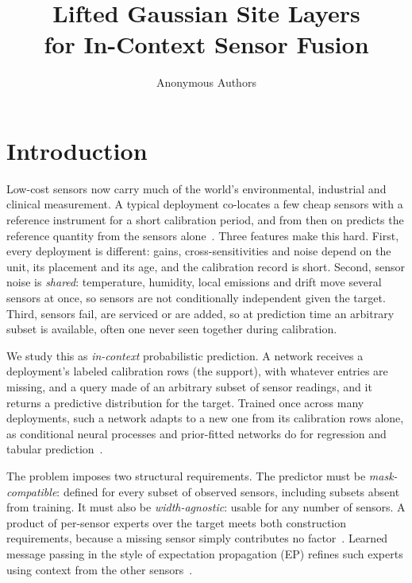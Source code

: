 \documentclass{article}
\title{Lifted Gaussian Site Layers\\for In-Context Sensor Fusion}
\author{Anonymous Authors}
\begin{document}
\maketitle

\begin{abstract}

\end{abstract}

\section{Introduction}

Low-cost sensors now carry much of the world's environmental, industrial and clinical measurement. A typical deployment
co-locates a few cheap sensors with a reference instrument for a short calibration period, and from then on predicts
the reference quantity from the sensors alone~\citep{zimmerman2018calibration}. Three features make this hard. First, every deployment is different:
gains, cross-sensitivities and noise depend on the unit, its placement and its age, and the calibration record is
short. Second, sensor noise is \emph{shared}: temperature, humidity, local emissions and drift move several sensors at
once, so sensors are not conditionally independent given the target. Third, sensors fail, are serviced or are added, so
at prediction time an arbitrary subset is available, often one never seen together during calibration.

We study this as \emph{in-context} probabilistic prediction. A network receives a deployment's labeled calibration rows
(the support), with whatever entries are missing, and a query made of an arbitrary subset of sensor readings, and it
returns a predictive distribution for the target. Trained once across many deployments, such a network adapts to a new
one from its calibration rows alone, as conditional neural processes and prior-fitted networks do for regression and
tabular prediction~\citep{garnelo2018cnp,muller2022pfn,hollmann2025tabpfnv2}.

The problem imposes two structural requirements. The predictor must be \emph{mask-compatible}: defined for
every subset of observed sensors, including subsets absent from training. It must also be \emph{width-agnostic}: usable
for any number of sensors. A product of per-sensor experts over the target meets both construction requirements, because a
missing sensor simply contributes no factor~\citep{hinton2002poe,wu2018mvae}. Learned message passing in the style of
expectation propagation (EP) refines such experts using context from the other sensors~\citep{minka2001ep,heess2013learning}.
\end{document}
